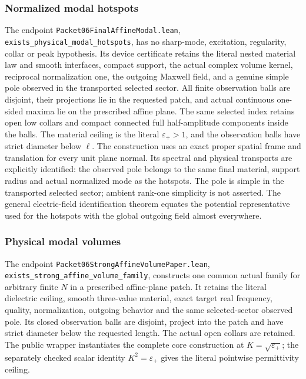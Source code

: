 \subsubsection*{Normalized modal hotspots}
The endpoint \texttt{Packet06FinalAffineModal.lean},
\texttt{exists\_physical\_modal\_hotspots}, has no sharp-mode, excitation,
regularity, collar or peak hypothesis.  Its device certificate retains
the literal nested material law and smooth interfaces, compact support,
the actual complex volume kernel, reciprocal normalization one,
the outgoing Maxwell field, and a genuine simple pole observed in the
transported selected sector.  All finite observation balls are
disjoint, their projections lie in the requested patch, and actual
continuous one-sided maxima lie on the prescribed affine plane.  The same
selected index retains open low collars and compact connected full
half-amplitude components inside the balls.
The material ceiling is the literal $\varepsilon_+>1$, and the
observation balls have strict diameter below $\ell$. The construction
uses an exact proper spatial frame and translation for every unit plane
normal. Its spectral and physical transports are explicitly identified:
the observed pole belongs to the same final material, support radius
and actual normalized mode as the hotspots. The pole is simple in the
transported selected sector; ambient rank-one simplicity is not asserted.
The general electric-field identification theorem equates the potential
representative used for the hotspots with the global outgoing field
almost everywhere.

\subsubsection*{Physical modal volumes}
The endpoint \texttt{Packet06StrongAffineVolumePaper.lean},
\texttt{exists\_\allowbreak strong\_\allowbreak affine\_\allowbreak volume\_\allowbreak family}, constructs one common
actual family for arbitrary finite $N$ in a prescribed affine-plane
patch. It retains the literal dielectric ceiling, smooth three-value
material, exact target real frequency, quality, normalization, outgoing
behavior and the same selected-sector observed pole. Its closed
observation balls are disjoint, project into the patch and have strict
diameter below the requested length. The actual open collars are retained.
The public wrapper instantiates the complete core construction at
$K=\sqrt{\varepsilon_+}$; the separately checked scalar identity
$K^2=\varepsilon_+$ gives the literal pointwise permittivity ceiling.

